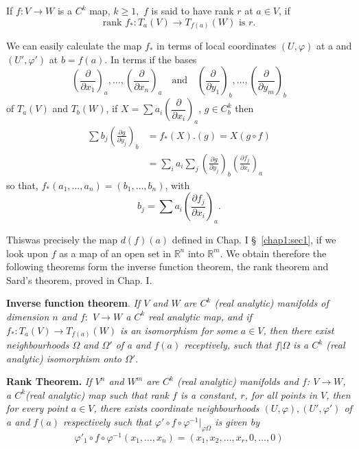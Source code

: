\begin{defi*}
  If $f: V \to W$ is  a $C^k$  map, $k \ge 1,$ $f$ is said
    to have rank $r$ at $a \in V$, if 
  $$
  \text{rank } f_* : T_a (V) \to T_{f(a)}(W) \text{ is } r.
  $$
\end{defi*}    
    
We can easily  calculate the map $f_*$ in terms of local coordinates
$(U, \varphi)$ at a  and $(U' , \varphi')$ at $b=f(a)$. In terms if
the bases  $$\left(\dfrac{\partial}{\partial x_1}\right)_a , \ldots,
\left(\dfrac{\partial}{\partial x_n}\right)_a\quad 
\mbox{and}\quad \left(\dfrac{\partial}{\partial 
  y_1}\right)_b, \ldots, \left(\dfrac{\partial}{\partial
  y_m}\right)_b$$ of $T_a(V)$ 
and $T_b(W)$, if $X= \sum a_i \left(\dfrac{\partial}{\partial x_i}\right)_a$, $g
\in C^k_b$ then  
\begin{align*}
  \sum b_j \left(\frac{\partial g}{\partial y_j}\right)_b &= f_*
  (X). (g) = X(g \circ f) \\ 
  &= \sum_i a_i  \sum_j \left(\frac{\partial g}{\partial y_j}\right)_b
  \left(\frac{\partial f_j}{\partial x_i}\right)_a  
\end{align*}    
so that, $f_* (a_1, \ldots , a_n)= (b_1, \ldots , b_n)$, with 
$$
b_j = \sum a_i \left(\frac{\partial f_j}{\partial x_i}\right)_a.
$$

This\pageoriginale was precisely the map $d(f)(a)$ defined in Chap. I
\S\ \ref{chap1:sec1}, if we
look upon $f$ as a map of an open set in $\mathbb{R}^n$ into
$\mathbb{R}^m$. We obtain therefore the following theorems form the
inverse function theorem, the rank theorem and Sard's theorem, proved
in Chap. I. 
    
\noindent
\textbf{Inverse function theorem}. \textit{If $V$ and  $W$  are $C^k$
  (real analytic) manifolds of dimension $n$ and $f:$ $V \to W$ a $C^k$
  real analytic map, and if $f_* : T_a (V) \to T_{f(a)}(W)$ is an
  isomorphism for some $a \in V$, then there exist neighbourhoods
  $\Omega $ and $\Omega'$ of a and $f(a)$ receptively, such that $f
  |\Omega$ is a $C^k$ (real analytic) isomorphism onto $\Omega'$}. 
    
\noindent
\textbf{Rank Theorem.} \textit{If $V^n$ and $W^m$ are $C^k$ (real
  analytic) manifolds and  $f$: $V \to W$, a $C^k$(real analytic) map
  such that rank  $f$ is a constant, $r$,  for all points in $V$, then
  for every point $a \in V$, there exists coordinate neighbourhoods
  $(U, \varphi), (U', \varphi')$ of a and $f(a)$ respectively such
  that $\varphi' \circ  f \circ  \varphi^{-1} | _{\varphi \Omega}$ is given
  by} 
$$\varphi'_1 \circ f \circ \varphi^{-1}(x_1, \ldots , x_n) = (x_1, x_2,
  \ldots , x_r, 0 , \ldots ,  0)
$$ 
    
